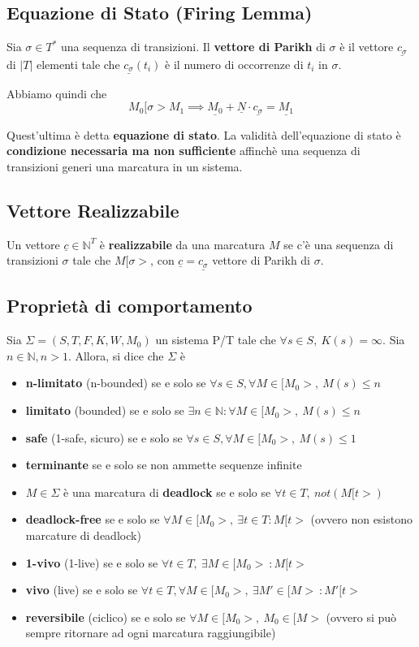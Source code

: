 \subsection{Equazione di Stato (Firing Lemma)}

Sia $\sigma \in T^*$ una sequenza di transizioni.
Il \textbf{vettore di Parikh} di $\sigma$ è il vettore $\underline{c_\sigma}$ di $|T|$ elementi tale che $\underline{c_\sigma}(t_i)$ è il numero di occorrenze di $t_i$ in $\sigma$.

Abbiamo quindi che
\[
	M_0[\sigma>M_1
	\implies
	\underline{M_0} + \underline N \cdot \underline{c_\sigma}  =  \underline{M_1}
\]

Quest'ultima è detta \textbf{equazione di stato}. La validità dell'equazione di stato è \textbf{condizione necessaria ma non sufficiente} affinchè una sequenza di transizioni generi una marcatura in un sistema.

\subsection{Vettore Realizzabile}

Un vettore $\underline c \in \mathbb N^T$ è \textbf{realizzabile} da una marcatura $M$ se c'è una sequenza di transizioni $\sigma$ tale che $M[\sigma >$, con $\underline c = \underline{c_\sigma}$ vettore di Parikh di $\sigma$.

\subsection{Proprietà di comportamento}

Sia $\Sigma = (S, T, F, K, W, M_0)$ un sistema P/T tale che $\forall s \in S, \ K(s) = \infty$. Sia $n \in \mathbb N, n>1$. Allora, si dice che $\Sigma$ è


\begin{itemize}
	\item \textbf{n-limitato} (n-bounded) se e solo se $\forall s \in S, \forall M \in [M_0>, \ M(s) \leq n$
	\item \textbf{limitato} (bounded) se e solo se $\exists n \in \mathbb N : \forall M \in [M_0>, \ M(s) \leq n$
	\item \textbf{safe} (1-safe, sicuro) se e solo se $\forall s \in S, \forall M \in [M_0>, \ M(s) \leq 1$
	\item \textbf{terminante} se e solo se non ammette sequenze infinite
	\item $M\in\Sigma$ è una marcatura di \textbf{deadlock} se e solo se $\forall t \in T, \ not(M[t>)$
	\item \textbf{deadlock-free} se e solo se $\forall M \in [M_0>, \ \exists t \in T : M[t>$ (ovvero non esistono marcature di deadlock)
	\item \textbf{1-vivo} (1-live) se e solo se $\forall t \in T, \ \exists M \in [M_0> \ : M[t>$
	\item \textbf{vivo} (live) se e solo se $\forall t \in T, \forall M \in [M_0>, \ \exists M' \in [M> \ : M'[t>$
	\item \textbf{reversibile} (ciclico) se e solo se $\forall M \in [M_0>, \ M_0 \in [M>$ (ovvero si può sempre ritornare ad ogni marcatura raggiungibile)
\end{itemize}

